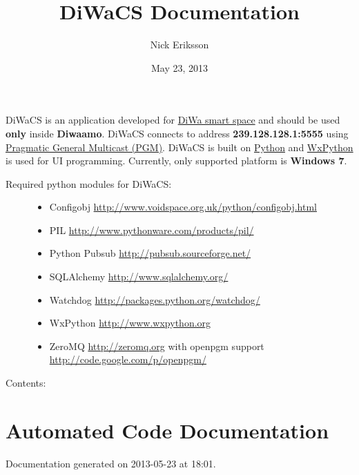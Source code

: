 \documentclass[letterpaper,10pt,english]{sphinxmanual}
\title{DiWaCS Documentation}
\date{May 23, 2013}
\author{Nick Eriksson}
\begin{document}
\maketitle
\tableofcontents
{}\label{index::doc}


DiWaCS is an application developed for \href{https://cse.aalto.fi/research/groups/stratus/research/research-projects/}{DiWa smart space} and should be used \textbf{only} inside \textbf{Diwaamo}. DiWaCS connects to address \textbf{239.128.128.1:5555} using \href{http://code.google.com/p/openpgm/}{Pragmatic General Multicast (PGM)}. DiWaCS is built on \href{http://www.python.org}{Python} and \href{http://www.wxpython.org}{WxPython} is used for UI programming. Currently, only supported platform is \textbf{Windows 7}.
\begin{description}
\item[{Required python modules for DiWaCS:}] \leavevmode\begin{itemize}
\item {} 
Configobj \href{http://www.voidspace.org.uk/python/configobj.html}{http://www.voidspace.org.uk/python/configobj.html}

\item {} 
PIL \href{http://www.pythonware.com/products/pil/}{http://www.pythonware.com/products/pil/}

\item {} 
Python Pubsub \href{http://pubsub.sourceforge.net/}{http://pubsub.sourceforge.net/}

\item {} 
SQLAlchemy \href{http://www.sqlalchemy.org/}{http://www.sqlalchemy.org/}

\item {} 
Watchdog  \href{http://packages.python.org/watchdog/}{http://packages.python.org/watchdog/}

\item {} 
WxPython \href{http://www.wxpython.org}{http://www.wxpython.org}

\item {} 
ZeroMQ \href{http://zeromq.org}{http://zeromq.org} with openpgm support \href{http://code.google.com/p/openpgm/}{http://code.google.com/p/openpgm/}

\end{itemize}

\end{description}

Contents:


\chapter{Automated Code Documentation}
\label{api:automated-code-documentation}\label{api::doc}\label{api:welcome-to-diwacs-documentation}
Documentation generated on 2013-05-23 at 18:01.
\end{document}
